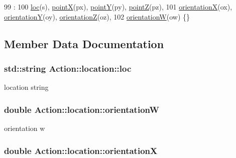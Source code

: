 \begin{DoxyCode}
99                                                               :
100                   \hyperlink{structAction_1_1location_acc93573155b47f4a802f420c553a49e0}{loc}(s), \hyperlink{structAction_1_1location_aa8df7e1f54d12a455af659f1c6443e0c}{pointX}(px), \hyperlink{structAction_1_1location_a0146e2b44bd7e2495234fa17cc6f1f6f}{pointY}(py), \hyperlink{structAction_1_1location_adafdc7ffa240979fd0a7a86ab43fb6fc}{pointZ}(pz),
101                   \hyperlink{structAction_1_1location_a0bf20c9eb2d9b7c8bda3271f643a2ba8}{orientationX}(ox), \hyperlink{structAction_1_1location_aab40c1aea8f1b3614bd1cc379c24fef6}{orientationY}(oy), 
      \hyperlink{structAction_1_1location_a9b6f1a2418c92521a96efa388f5b0c70}{orientationZ}(oz),
102                   \hyperlink{structAction_1_1location_abccc48432b064e482f2a1f95f9799d30}{orientationW}(ow) \{\}
\end{DoxyCode}


\subsection{Member Data Documentation}
\hypertarget{structAction_1_1location_acc93573155b47f4a802f420c553a49e0}{
\subsubsection[{loc}]{\setlength{\rightskip}{0pt plus 5cm}std\-::string Action\-::location\-::loc}}\label{structAction_1_1location_acc93573155b47f4a802f420c553a49e0}


location string 

\hypertarget{structAction_1_1location_abccc48432b064e482f2a1f95f9799d30}{
\subsubsection[{orientation\-W}]{\setlength{\rightskip}{0pt plus 5cm}double Action\-::location\-::orientation\-W}}\label{structAction_1_1location_abccc48432b064e482f2a1f95f9799d30}


orientation w 

\hypertarget{structAction_1_1location_a0bf20c9eb2d9b7c8bda3271f643a2ba8}{
\subsubsection[{orientation\-X}]{\setlength{\rightskip}{0pt plus 5cm}double Action\-::location\-::orientation\-X}}\label{structAction_1_1location_a0bf20c9eb2d9b7c8bda3271f643a2ba8}


